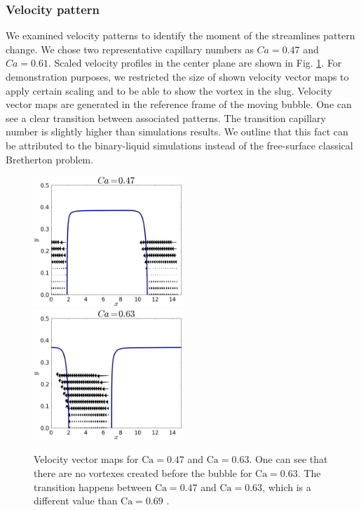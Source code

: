 \documentclass{CFD2011}
\newcommand{\Ca}{\mathrm{Ca}}
\begin{document}
\subsubsection{Velocity pattern}
We examined velocity patterns to identify the moment of the streamlines pattern change. We chose two
representative capillary numbers as $Ca=0.47$ and $Ca=0.61$. Scaled velocity profiles in the center
plane are shown  in Fig. \ref{fig:streamlines:pattern}. For demonstration purposes, we restricted
the size of shown velocity vector maps to apply certain scaling and to be able to show the vortex in
the slug. Velocity vector maps are generated in the reference frame of the moving bubble. One can
see a clear transition between associated patterns. The transition capillary number
\cite{heil-threedim} is slightly higher than simulations results. We outline that this fact can be
attributed to the binary-liquid simulations instead of the free-surface classical Bretherton
problem. 
\begin{figure}[!]
\includegraphics[width=0.5\textwidth]{Figures/vortex_ca47_png.eps}\\
\includegraphics[width=0.5\textwidth]{Figures/vortex_ca63_png.eps}\\
\caption{Velocity vector maps for $\Ca=0.47$ and $\Ca=0.63$. One can see that there are no vortexes
created
before the bubble for $\Ca=0.63$. The transition happens between $\Ca=0.47$ and $\Ca=0.63$, which
is a different value than $\Ca=0.69$ \cite{heil-threedim}. \label{fig:streamlines:pattern}}
\end{figure}
\end{document}
